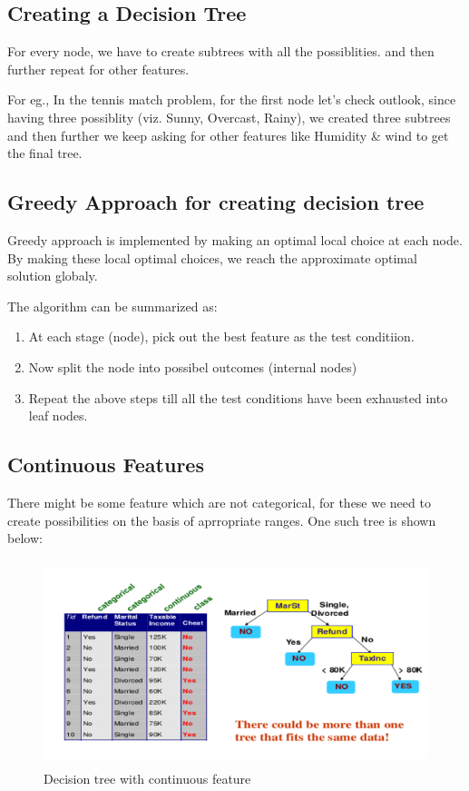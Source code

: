 \documentclass[12pt, A4]{report}
\begin{document}
\vspace{5mm}
\subsection*{Creating a Decision Tree}
	For every node, we have to create subtrees with all the possiblities. and then further repeat for other features.\par
	For eg., In the tennis match problem, for the first node  let's check outlook, since having three possiblity (viz. Sunny, Overcast, Rainy), we created three subtrees and then further we keep asking for other features like Humidity \& wind to get the final tree.  

\vspace{5mm}
\subsection*{Greedy Approach for creating decision tree}
	Greedy approach is implemented by making an optimal local choice at each node. By making these local optimal choices, we reach the approximate optimal solution globaly.

	The algorithm can be summarized as: 
	\begin{enumerate}
		\item At each stage (node), pick out the best feature as the test conditiion.
		\item Now split the node into possibel outcomes (internal nodes)
		\item Repeat the above steps till all the test conditions have been exhausted into leaf nodes.
	\end{enumerate}

\vspace{5mm}
\subsection*{Continuous Features}
	There might be some feature which are not categorical, for these we need to create possibilities on the basis of aprropriate ranges. One such tree is shown below:
	\begin{figure}[h]
		\centering
		\includegraphics[width=12cm, height=6cm]{continuousDT.png}
		\caption{Decision tree with continuous feature}
	\end{figure}
\end{document}
